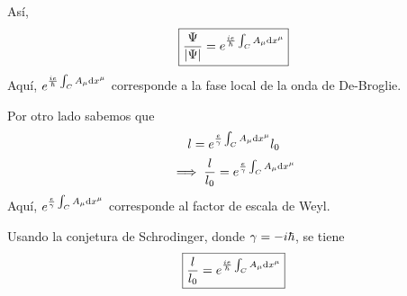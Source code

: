 Así,
\begin{equation}
\boxed{  \frac{\Psi}{|\Psi |}=e^{\frac{ie}{\hbar}\int_C A_\mu\dd x^\mu }}
\end{equation}
Aquí, $e^{\frac{ie}{\hbar}\int_C A_\mu\dd x^\mu }$ corresponde a la fase local de la onda de De-Broglie.

Por otro lado sabemos que 
\begin{equation}
  l=e^{\frac{e}{\gamma }\int_C A_\mu \dd x^\mu }l_0
\end{equation}
\begin{equation}
  \implies \frac{l}{l_0 }=e^{\frac{e}{\gamma }\int_C A_\mu \dd x^\mu }
\end{equation}
Aquí, $e^{\frac{e}{\gamma }\int_C A_\mu \dd x^\mu }$ corresponde al factor de escala de Weyl.

Usando la conjetura de Schrodinger, donde $\gamma =-i\hbar$, se tiene
\begin{equation}
\boxed{  \frac{l}{l_0 }=e^{\frac{ie}{\hbar}\int_C A_\mu \dd x^\mu }}
\end{equation}

